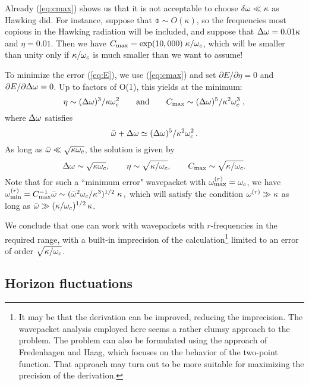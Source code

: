 Already (\ref{eq:cmax}) shows us that it is not acceptable
to choose $\delta\omega\ll\kappa$ as Hawking did. For instance,
suppose that $\obar\sim O(\kappa)$, so the frequencies most
copious in the Hawking radiation will be included,
and suppose that $\Delta\omega=0.01\kappa$ and $\eta=0.01$.
Then we have $C_{\rm max}=\exp(10,000)\; \kappa/\omega_c$,
which will be smaller than unity only if $\kappa/\omega_c$ is
much smaller than we want to assume!

To minimize the error (\ref{eq:E}), we use (\ref{eq:cmax}) and
set $\partial E/\partial \eta=0$ and
$\partial E/\partial \Delta\omega=0$.
Up to factors of O(1), this yields at the minimum:
\begin{equation}
\eta\sim(\Delta\omega)^3/\kappa\omega_c^2
\qquad {\rm and} \qquad
C_{\rm max}\sim(\Delta\omega)^5/\kappa^2\omega_c^3\; ,
\end{equation}
where $\Delta\omega$ satisfies
\begin{equation}
\bar{\omega}+\Delta\omega\simeq(\Delta\omega)^5/\kappa^2\omega_c^2\, .
\end{equation}
As long as $\bar{\omega}\ll \sqrt{\kappa\omega_c}$, the solution is
given by
\begin{equation}
\Delta\omega\sim \sqrt{\kappa\omega_c},
\qquad \eta\sim\sqrt{\kappa/\omega_c},
\qquad C_{\rm max}\sim\sqrt{\kappa/\omega_c}.
\label{eq:error}
\end{equation}
Note that for such a ``minimum error" wavepacket with
$\omega^{(r)}_{\rm max}=\omega_c$, we have
$\omega^{(r)}_{\rm min}=C_{\rm max}^{-1}\bar{\omega}
\sim (\bar{\omega}^2\omega_c/\kappa^3)^{1/2}\; \kappa\, ,$
which will satisfy the condition $\omega^{(r)}\gg \kappa$
as long as $\bar{\omega}\gg(\kappa/\omega_c)^{1/2}\, \kappa$.

We conclude that one can work with wavepackets with $r$-frequencies
in the required range, with a built-in imprecision of the
calculation\footnote{It may be that the derivation can be improved,
reducing the
imprecision. The wavepacket analysis employed here seems a rather
clumsy approach to the problem. The problem can also be
formulated using the approach of Fredenhagen and
Haag\cite{FredHaag}, which focuses on the behavior of the two-point
function. That approach may turn out to be more suitable for
maximizing the precision of the derivation.}
limited to an error of order $\sqrt{\kappa/\omega_c}$.

\subsection{Horizon fluctuations}
\label{subsec:horfluct}


